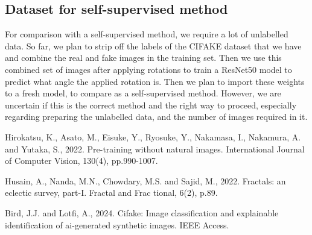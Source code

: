 \documentclass[10pt,twocolumn,letterpaper]{article}
\begin{document}
\subsection{Dataset for self-supervised method}

For comparison with a self-supervised method, we require a lot of unlabelled data. So far, we plan to strip off the labels of the CIFAKE dataset that we have and combine the real and fake images in the training set. Then we use this combined set of images after applying rotations to train a ResNet50 model to predict what angle the applied rotation is. Then we plan to import these weights to a fresh model, to compare as a self-supervised method. However, we are uncertain if this is the correct method and the right way to proceed, especially regarding preparing the unlabelled data, and the number of images required in it. 

{\small



\begin{thebibliography}{99}

 Hirokatsu, K., Asato, M., Eisuke, Y., Ryosuke, Y., Nakamasa, I., Nakamura, A. and Yutaka, S., 2022. Pre-training without natural images. International Journal of Computer Vision, 130(4), pp.990-1007.

 Husain, A., Nanda, M.N., Chowdary, M.S. and Sajid, M., 2022. Fractals: an eclectic survey, part-I. Fractal and Frac tional, 6(2), p.89.

 Bird, J.J. and Lotfi, A., 2024. Cifake: Image classification and explainable identification of ai-generated synthetic images. IEEE Access.

\end{thebibliography}
}
\end{document}
